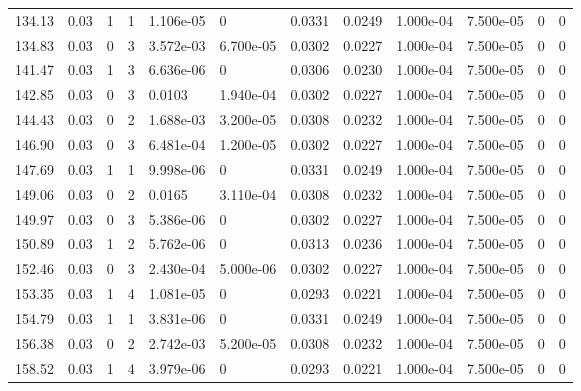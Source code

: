 \documentclass[preview]{standalone}
\begin{document}
{{{\begin{tabular}{L{1.2cm}C{1.2cm} C{0.3cm}C{0.5cm} C{1.4cm}C{1.4cm} C{1.4cm}C{1.4cm} C{1.6cm}C{1.6cm} C{1.6cm}C{1.6cm}}
  134.13  &  0.03  & 1     &  1 &  1.106e-05  & 0  &  0.0331&   0.0249& 1.000e-04 & 7.500e-05   &  0 & 0  \\ 
  134.83  &  0.03  & 0     &  3 &  3.572e-03  & 6.700e-05  &  0.0302&   0.0227& 1.000e-04 & 7.500e-05   &  0 & 0  \\ 
  141.47  &  0.03  & 1     &  3 &  6.636e-06  & 0  &  0.0306&   0.0230& 1.000e-04 & 7.500e-05   &  0 & 0  \\ 
  142.85  &  0.03  & 0     &  3 &  0.0103  & 1.940e-04  &  0.0302&   0.0227& 1.000e-04 & 7.500e-05   &  0 & 0  \\ 
  144.43  &  0.03  & 0     &  2 &  1.688e-03  & 3.200e-05  &  0.0308&   0.0232& 1.000e-04 & 7.500e-05   &  0 & 0  \\ 
  146.90  &  0.03  & 0     &  3 &  6.481e-04  & 1.200e-05  &  0.0302&   0.0227& 1.000e-04 & 7.500e-05   &  0 & 0  \\ 
  147.69  &  0.03  & 1     &  1 &  9.998e-06  & 0  &  0.0331&   0.0249& 1.000e-04 & 7.500e-05   &  0 & 0  \\ 
  149.06  &  0.03  & 0     &  2 &  0.0165  & 3.110e-04  &  0.0308&   0.0232& 1.000e-04 & 7.500e-05   &  0 & 0  \\ 
  149.97  &  0.03  & 0     &  3 &  5.386e-06  & 0  &  0.0302&   0.0227& 1.000e-04 & 7.500e-05   &  0 & 0  \\ 
  150.89  &  0.03  & 1     &  2 &  5.762e-06  & 0  &  0.0313&   0.0236& 1.000e-04 & 7.500e-05   &  0 & 0  \\ 
  152.46  &  0.03  & 0     &  3 &  2.430e-04  & 5.000e-06  &  0.0302&   0.0227& 1.000e-04 & 7.500e-05   &  0 & 0  \\ 
  153.35  &  0.03  & 1     &  4 &  1.081e-05  & 0  &  0.0293&   0.0221& 1.000e-04 & 7.500e-05   &  0 & 0  \\ 
  154.79  &  0.03  & 1     &  1 &  3.831e-06  & 0  &  0.0331&   0.0249& 1.000e-04 & 7.500e-05   &  0 & 0  \\ 
  156.38  &  0.03  & 0     &  2 &  2.742e-03  & 5.200e-05  &  0.0308&   0.0232& 1.000e-04 & 7.500e-05   &  0 & 0  \\ 
  158.52  &  0.03  & 1     &  4 &  3.979e-06  & 0  &  0.0293&   0.0221& 1.000e-04 & 7.500e-05   &  0 & 0  \\ 
\hline 
\end{tabular} 

}}}
\end{document}
